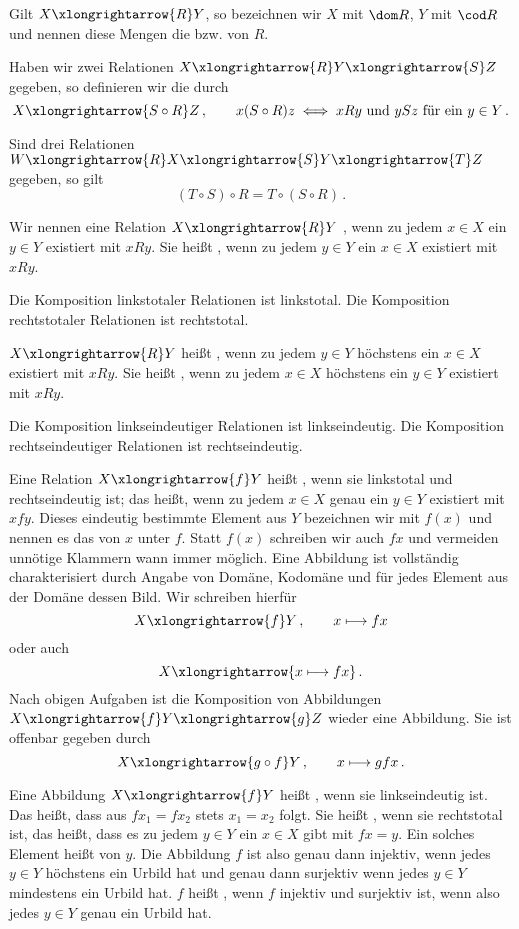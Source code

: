 Gilt $X\xlongrightarrow{R}Y$, so bezeichnen wir $X$ mit $\dom R$, $Y$ mit $\cod R$ und nennen diese Mengen die  bzw.  von $R$.

Haben wir zwei Relationen $X\xlongrightarrow{R}Y\xlongrightarrow{S}Z$ gegeben, so definieren wir die  durch
\[
X\xlongrightarrow{S\circ R}Z\,,\qquad x(S\circ R)z\iff xRy\text{ und }ySz\text{ für ein }y\in Y\,.
\]
\begin{task}
Sind drei Relationen $W\xlongrightarrow{R}X\xlongrightarrow{S}Y\xlongrightarrow{T}Z$ gegeben, so gilt
\[(T\circ S)\circ R=T\circ(S\circ R)\,.\]
\end{task}
Wir nennen eine Relation $X\xlongrightarrow{R}Y$ , wenn zu jedem $x\in X$ ein $y\in Y$ existiert mit $xRy$. Sie heißt , wenn zu jedem $y\in Y$ ein $x\in X$ existiert mit $xRy$.
\begin{task}
Die Komposition linkstotaler Relationen ist linkstotal. Die Komposition rechtstotaler Relationen ist rechtstotal.
\end{task}
$X\xlongrightarrow{R}Y$ heißt , wenn zu jedem $y\in Y$ höchstens ein $x\in X$ existiert mit $xRy$. Sie heißt , wenn zu jedem $x\in X$ höchstens ein $y\in Y$ existiert mit $xRy$.
\begin{task}
Die Komposition linkseindeutiger Relationen ist linkseindeutig. Die Komposition rechtseindeutiger Relationen ist rechtseindeutig.
\end{task}
Eine Relation $X\xlongrightarrow{f}Y$ heißt , wenn sie linkstotal und rechtseindeutig ist; das heißt, wenn zu jedem $x\in X$ genau ein $y\in Y$ existiert mit $xfy$. Dieses eindeutig bestimmte Element aus $Y$ bezeichnen wir mit $f(x)$ und nennen es das  von $x$ unter $f$. Statt $f(x)$ schreiben wir auch $fx$ und vermeiden unnötige Klammern wann immer möglich. Eine Abbildung ist vollständig charakterisiert durch Angabe von Domäne, Kodomäne und für jedes Element aus der Domäne dessen Bild. Wir schreiben hierfür
\[
X\xlongrightarrow{f}Y\,,\qquad x\longmapsto fx
\]
oder auch
\[
X\xlongrightarrow{x\longmapsto fx}\,.
\]
Nach obigen Aufgaben ist die Komposition von Abbildungen $X\xlongrightarrow{f}Y\xlongrightarrow{g}Z$ wieder eine Abbildung. Sie ist offenbar gegeben durch
\[
X\xlongrightarrow{g\circ f}Y\,,\qquad x\longmapsto gfx\,.
\]

Eine Abbildung $X\xlongrightarrow{f}Y$ heißt , wenn sie linkseindeutig ist. Das heißt, dass aus $fx_1=fx_2$ stets $x_1=x_2$ folgt. Sie heißt , wenn sie rechtstotal ist, das heißt, dass es zu jedem $y\in Y$ ein $x\in X$ gibt mit $fx=y$. Ein solches Element heißt  von $y$. Die Abbildung $f$ ist also genau dann injektiv, wenn jedes $y\in Y$ höchstens ein Urbild hat und genau dann surjektiv wenn jedes $y\in Y$ mindestens ein Urbild hat. $f$ heißt , wenn $f$ injektiv und surjektiv ist, wenn also jedes $y\in Y$ genau ein Urbild hat.


